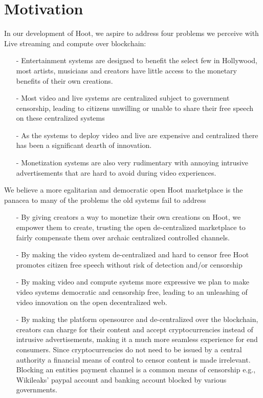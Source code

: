 \documentclass{article}
\begin{document}
\section{Motivation}
In our development of Hoot, we aspire to address four problems we perceive with
Live streaming and compute over blockchain:
\begin{itemize}
\item[-] Entertainment systems are designed to benefit the select few
  in Hollywood, most artists, musicians and creators have little access to the monetary
  benefits of their own creations.
\item[-] Most video and live systems are centralized subject to
  government censorship, leading to citizens unwilling or unable to
  share their free speech on these centralized systems
\item[-] As the systems to deploy video and live are expensive and
  centralized there has been a significant dearth of innovation.
\item[-] Monetization systems are also very rudimentary with annoying
  intrusive advertisements that are hard to avoid during video
  experiences. 
\end{itemize}

We believe a more egalitarian and democratic open Hoot marketplace is the
panacea to many of the problems the old systems fail to address
\begin{itemize}
\item[-] By giving creators a way to monetize their own creations on Hoot, we
empower them to create, trusting the open de-centralized marketplace to fairly compensate
them over archaic centralized controlled channels.
\item[-] By making the video system de-centralized and hard to censor free Hoot promotes
  citizen free speech without risk of detection and/or censorship
\item[-] By making video and compute systems more expressive we
  plan to make video systems democratic and censorship free, leading
  to an unleashing of video innovation on the open decentralized web.
\item[-] By making the platform opensource and de-centralized over the
  blockchain, creators can charge for their content and accept
  cryptocurrencies instead of intrusive advertisements, making it a
  much more seamless experience for end consumers. Since
  cryptocurrencies do not need to be issued by a central authority
  a financial means of control to censor content is made irrelevant. Blocking an entities
  payment channel is a common means of censorship e.g.,  Wikileaks'
  paypal account and banking account blocked by various governments.
\end{itemize}
\end{document}
